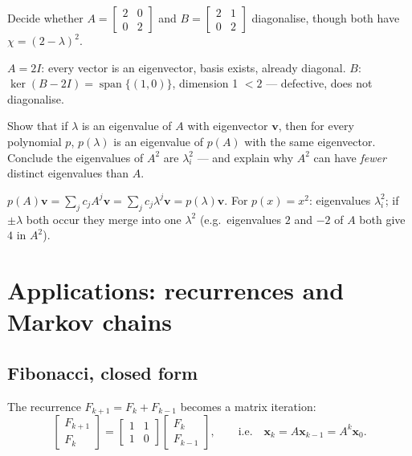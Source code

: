 \begin{exercise}[medium]
Decide whether $A=\begin{bmatrix}2&0\\0&2\end{bmatrix}$ and
$B=\begin{bmatrix}2&1\\0&2\end{bmatrix}$ diagonalise, though both have
$\chi=(2-\lambda)^2$.
\begin{solution}
$A=2I$: every vector is an eigenvector, basis exists, already diagonal.
$B$: $\ker(B-2I)=\operatorname{span}\{(1,0)\}$, dimension 1 $<2$ ---
defective, does not diagonalise.
\end{solution}
\end{exercise}

\begin{exercise}[hard]
Show that if $\lambda$ is an eigenvalue of $A$ with eigenvector
$\mathbf v$, then for every polynomial $p$, $p(\lambda)$ is an eigenvalue
of $p(A)$ with the same eigenvector. Conclude the eigenvalues of $A^2$ are
$\lambda_i^2$ --- and explain why $A^2$ can have \emph{fewer} distinct
eigenvalues than $A$.
\begin{solution}
$p(A)\mathbf v=\sum_j c_jA^j\mathbf v=\sum_j c_j\lambda^j\mathbf v
=p(\lambda)\mathbf v$. For $p(x)=x^2$: eigenvalues $\lambda_i^2$; if
$\pm\lambda$ both occur they merge into one $\lambda^2$ (e.g.\
eigenvalues $2$ and $-2$ of $A$ both give $4$ in $A^2$).
\end{solution}
\end{exercise}

\section{Applications: recurrences and Markov chains}\label{sec:eig-apps}

\subsection*{Fibonacci, closed form}

The recurrence $F_{k+1}=F_k+F_{k-1}$ becomes a matrix iteration:
\[
\begin{bmatrix}F_{k+1}\\F_{k}\end{bmatrix}
=\begin{bmatrix}1&1\\1&0\end{bmatrix}
\begin{bmatrix}F_{k}\\F_{k-1}\end{bmatrix},
\qquad\text{i.e.}\quad \mathbf x_{k}=A\mathbf x_{k-1}=A^{k}\mathbf x_0 .
\]

